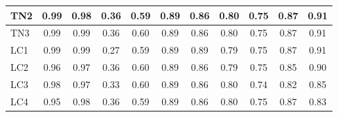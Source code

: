 \documentclass[./dissertation.tex]{subfiles}
\begin{document}
\begin{table}[!ht]
\begin{tabular}{|l|c|c|c|c|c|c|c|c|c|c|}
    TN2                       & 0.99                                 & 0.98                                  & 0.36                                   & 0.59                                    & 0.89                                   & 0.86                                     & 0.80                                    & 0.75                                    & 0.87                                   & 0.91                                  \\ \hline
    TN3                       & 0.99                                 & 0.99                                  & 0.36                                   & 0.60                                    & 0.89                                   & 0.86                                     & 0.80                                    & 0.75                                    & 0.87                                   & 0.91                                  \\ \hline
    LC1                       & 0.99                                 & 0.99                                  & 0.27                                   & 0.59                                    & 0.89                                   & 0.89                                     & 0.79                                    & 0.75                                    & 0.87                                   & 0.91                                  \\ \hline
    LC2                       & 0.96                                 & 0.97                                  & 0.36                                   & 0.60                                    & 0.89                                   & 0.86                                     & 0.79                                    & 0.75                                    & 0.85                                   & 0.90                                  \\ \hline
    LC3                       & 0.98                                 & 0.97                                  & 0.33                                   & 0.60                                    & 0.89                                   & 0.86                                     & 0.80                                    & 0.74                                    & 0.82                                   & 0.85                                  \\ \hline
    LC4                       & 0.95                                 & 0.98                                  & 0.36                                   & 0.59                                    & 0.89                                   & 0.86                                     & 0.80                                    & 0.75                                    & 0.87                                   & 0.83                                  \\ \hline
  \end{tabular}
\end{table}
\end{document}
